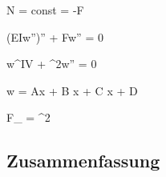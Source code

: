 \documentclass[11pt]{article}
\newcommand{\1}{ {\mathds{1}} }
\begin{document}
\begin{multicols*}{3}
		\begin{formel}{7.11}
			N = const = -F
		\end{formel}

		\begin{formel}{7.12}
			\left(EIw''\right)'' + Fw'' = 0
		\end{formel}

		\begin{formel}{7.13}
			w^{IV} + \lambda^2w'' = 0
		\end{formel}

		\begin{formel}{7.14}
			w = A\cos \lambda x + B \sin \lambda x + C \lambda x + D
		\end{formel}

		\begin{formel}{7.15}
			\times
		\end{formel}

		\begin{formel}{7.16}
			\times
		\end{formel}

		\begin{formel}{7.17}
			\times
		\end{formel}

		\begin{formel}{7.18}
			\times
		\end{formel}

		\begin{formel}{7.19}
			F_{} = \pi^2
		\end{formel}

		\subsection{Zusammenfassung}

	\end{multicols*}
\end{document}
